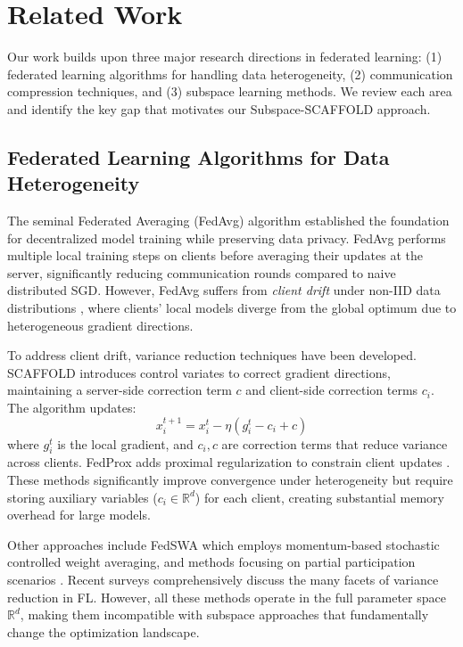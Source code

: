 \section{Related Work}

Our work builds upon three major research directions in federated learning: (1) federated learning algorithms for handling data heterogeneity, (2) communication compression techniques, and (3) subspace learning methods. We review each area and identify the key gap that motivates our Subspace-SCAFFOLD approach.

\subsection{Federated Learning Algorithms for Data Heterogeneity}

The seminal Federated Averaging (FedAvg) algorithm \cite{mcmahan2016fedavg} established the foundation for decentralized model training while preserving data privacy. FedAvg performs multiple local training steps on clients before averaging their updates at the server, significantly reducing communication rounds compared to naive distributed SGD. However, FedAvg suffers from \emph{client drift} under non-IID data distributions \cite{zhao2018non-iid}, where clients' local models diverge from the global optimum due to heterogeneous gradient directions.

To address client drift, variance reduction techniques have been developed. SCAFFOLD \cite{karimireddy2019scaffold} introduces control variates to correct gradient directions, maintaining a server-side correction term $c$ and client-side correction terms $c_i$. The algorithm updates:
\[
x_i^{t+1} = x_i^t - \eta (g_i^t - c_i + c)
\]
where $g_i^t$ is the local gradient, and $c_i, c$ are correction terms that reduce variance across clients. FedProx adds proximal regularization to constrain client updates \cite{li2019challenges}. These methods significantly improve convergence under heterogeneity but require storing auxiliary variables ($c_i \in \mathbb{R}^d$) for each client, creating substantial memory overhead for large models.

Other approaches include FedSWA \cite{liu2025fedswa} which employs momentum-based stochastic controlled weight averaging, and methods focusing on partial participation scenarios \cite{wang2025enhancing}. Recent surveys \cite{kairouz2019advances,rodio2025facets} comprehensively discuss the many facets of variance reduction in FL. However, all these methods operate in the full parameter space $\mathbb{R}^d$, making them incompatible with subspace approaches that fundamentally change the optimization landscape.

